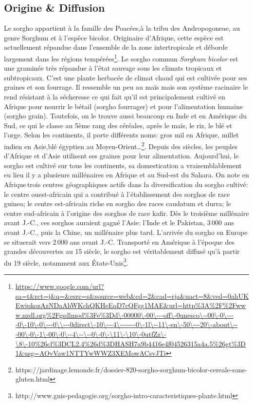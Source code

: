 \documentclass[a4paper,11pt]{article}
\begin{document}
  
\subsection{Origine \& Diffusion}
Le sorgho appartient à la famille des Poacées,à la tribu des Andropogoneae, au genre Sorghum
et à l'espèce bicolor. Originaire d'Afrique, cette espèce est actuellement répandue dans l'ensemble
de la zone intertropicale et déborde largement dans les régions tempérées\footnote{\url{https://www.google.com/url?sa=t&rct=j&q=&esrc=s&source=web&cd=2&cad=rja&uact=8&ved=0ahUKEwipkozAzNDaAhWKchQKHeEqD7cQFgg1MAE&url=http\%3A\%2F\%2Fwww.nzdl.org\%2Fgsdlmod\%3Fe\%3Dd\-00000\-00\---off\-0unesco\--00\-0\----0\-10\-0\---0\\---0direct\-10\---4\-------0\-1l\--11\-en\-50\---20\-about\---00\-0\-1\-00\-0\--4\--\--0\-0\-\11\-\10\-0utfZz\-\8\-10\%26cl\%3DCL2.4\%26d\%3DHASH7a9b4416e4f04526315a4a.5\%26gt\%3D1&usg=AOvVaw1NTTYwWWZ3XEMowACsvJTi}}. Le sorgho commun \emph{Sorghum bicolor} est
une graminée très répandue à l’état sauvage sous les climats tropicaux
et subtropicaux. C’est une plante  herbacée de climat chaud qui est cultivée
pour ses graines et son fourrage. Il ressemble un peu au maïs mais son système
racinaire le rend résistant à la sécheresse ce qui fait qu'il est principalement
cultivé en Afrique pour nourrir le bétail (sorgho fourrager) et pour l'alimentation
humaine (sorgho grain). Toutefois, on le trouve aussi beaucoup en Inde et en Amérique
du Sud, ce qui le classe au 5ème rang des céréales, après le maïs, le riz, le blé et
l'orge. Selon les continents, il porte différents noms: \og{}gros mil\fg{} en Afrique,
\og{}millet indien\fg{} en Asie,\og{}blé égyptien\fg{} au Moyen-Orient\ldots{}\footnote{https://jardinage.lemonde.fr/dossier-820-sorgho-sorghum-bicolor-cereale-sans-gluten.html}. Depuis des siècles,
les peuples d’Afrique et d’Asie utilisent ses graines pour leur alimentation. Aujourd’hui, le
sorgho est cultivé sur tous les continents, sa domestication a vraisemblablement
eu lieu il y a plusieurs millénaires en Afrique et au Sud-est du Sahara. On note en Afrique\,trois
centres géographiques actifs dans la diversification du sorgho cultivé:
le centre ouest-africain qui a contribué à l’établissement des sorghos de race guinea;
le centre est-africain riche en sorgho des races caudatum et durra; le centre sud-africain à
l’origine des sorghos de race kafir. Dès le troisième millénaire
avant J.-C., ces sorghos auraient gagné l’Asie: l’Inde et le Pakistan,
3\,000 ans avant J.-C., puis la Chine, un millénaire plus
tard. L’arrivée du sorgho en Europe se situerait vers 2\,000 ans avant
J.-C. Transporté en Amérique à l’époque des grandes découvertes au
15\ieme{} siècle, le sorgho est véritablement diffusé qu’à partir du 19\ieme{}
siècle, notamment aux États-Unis\footnote{http://www.gnis-pedagogie.org/sorgho-intro-caracteristiques-plante.html}.
\end{document}
